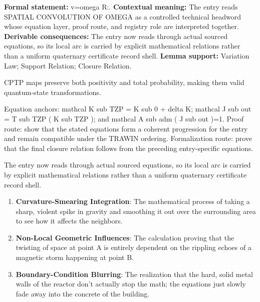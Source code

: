 \begingroup\footnotesize\setlength{\emergencystretch}{3em}\sloppy
\textbf{Formal statement:} v=omega R:. \textbf{Contextual meaning:} The entry reads SPATIAL CONVOLUTION OF OMEGA as a controlled technical headword whose equation layer, proof route, and registry role are interpreted together. \textbf{Derivable consequences:} The entry now reads through actual sourced equations, so its local arc is carried by explicit mathematical relations rather than a uniform quaternary certificate record shell. \textbf{Lemma support:} Variation Law; Support Relation; Closure Relation.\par
\endgroup

CPTP maps preserve both positivity and total probability, making them valid quantum-state transformations.

Equation anchors: mathcal K sub TZP = K sub 0 + delta K; mathcal J sub out = T sub TZP ( K sub TZP ); and mathcal A sub adm ( J sub out )=1. Proof route: show that the stated equations form a coherent progression for the entry and remain compatible under the TRAWIN ordering. Formalization route: prove that the final closure relation follows from the preceding entry-specific equations.

The entry now reads through actual sourced equations, so its local arc is carried by explicit mathematical relations rather than a uniform quaternary certificate record shell.
\endgroup

\begin{enumerate}[leftmargin=1.6em,itemsep=6pt,topsep=4pt]
\item \textbf{Curvature-Smearing Integration}: The mathematical process of taking a sharp, violent spike in gravity and smoothing it out over the surrounding area to see how it affects the neighbors.
\item \textbf{Non-Local Geometric Influences}: The calculation proving that the twisting of space at point A is entirely dependent on the rippling echoes of a magnetic storm happening at point B.
\item \textbf{Boundary-Condition Blurring}: The realization that the hard, solid metal walls of the reactor don't actually stop the math; the equations just slowly fade away into the concrete of the building.
\end{enumerate}

